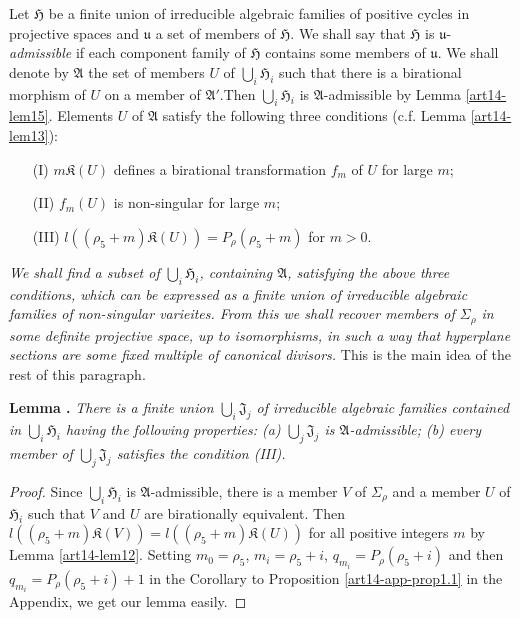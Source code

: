 Let $\mathfrak{H}$ be a finite union of irreducible algebraic families of positive cycles in projective spaces and $\mathfrak{u}$ a set of members of $\mathfrak{H}$. We shall say that $\mathfrak{H}$ is $\mathfrak{u}$-{\em admissible} if each component family of $\mathfrak{H}$ contains some members of $\mathfrak{u}$. We shall denote by $\mathfrak{A}$ the set of members $U$ of $\bigcup_{i}\mathfrak{H}_{i}$ such that there is a birational morphism of $U$ on a member of $\mathfrak{A}'$.\pageoriginale Then $\bigcup_{i}\mathfrak{H}_{i}$ is $\mathfrak{A}$-admissible by Lemma \ref{art14-lem15}. Elements $U$ of $\mathfrak{A}$ satisfy the following three conditions (c.f. Lemma \ref{art14-lem13}):
\begin{itemize}
\item[(I)] $m\mathfrak{K}(U)$ defines a birational transformation $f_{m}$ of $U$ for large $m$; 

\item[(II)] $f_{m}(U)$ is non-singular for large $m$;

\item[(III)] $l((\rho_{5}+m)\mathfrak{K}(U))=P_{\rho}(\rho_{5}+m)$ for $m>0$.
\end{itemize}
{\em We shall find a subset of $\bigcup_{i}\mathfrak{H}_{i}$, containing $\mathfrak{A}$, satisfying the above three conditions, which can be expressed as a finite union of irreducible algebraic families of non-singular varieites. From this we shall recover members of $\Sigma_{\rho}$ in some definite projective space, up to isomorphisms, in such a way that hyperplane sections are some fixed multiple of canonical divisors.} This is the main idea of the rest of this paragraph.

\medskip
\noindent
{\bf Lemma .\label{art14-lem15}}
{\em There is a finite union $\bigcup_{i}\mathfrak{J}_{j}$ of irreducible algebraic families contained in $\bigcup_{i}\mathfrak{H}_{i}$ having the following properties: {\rm(a)} $\bigcup_{j}\mathfrak{J}_{j}$ is $\mathfrak{A}$-admissible; {\rm(b)} every member of $\bigcup_{j}\mathfrak{J}_{j}$ satisfies the condition {\rm(III)}.}

\begin{proof}
Since $\bigcup_{i}\mathfrak{H}_{i}$ is $\mathfrak{A}$-admissible, there is a member $V$ of $\Sigma_{\rho}$ and a member $U$ of $\mathfrak{H}_{i}$ such that $V$ and $U$ are birationally equivalent. Then $l((\rho_{5}+m)\mathfrak{K}(V))=l((\rho_{5}+m)\mathfrak{K}(U))$ for all positive integers $m$ by Lemma \ref{art14-lem12}. Setting $m_{0}=\rho_{5}$, $m_{i}=\rho_{5}+i$, $q_{m_{i}}=P_{\rho}(\rho_{5}+i)$ and then $q_{m_{i}}=P_{\rho}(\rho_{5}+i)+1$ in the Corollary to Proposition \ref{art14-app-prop1.1} in the Appendix, we get our lemma easily.
\end{proof}

